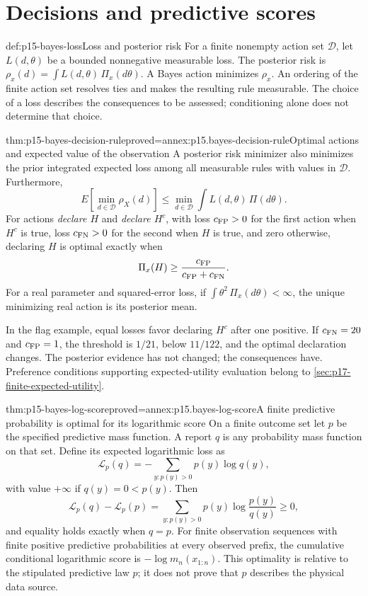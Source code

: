 \section{Decisions and predictive scores}
\label{sec:p15-bayes-decisions}

\begin{hbdefinition}{def:p15-bayes-loss}{Loss and posterior risk}
For a finite nonempty action set \(\mathcal D\), let
\(L(d,\theta)\) be a bounded nonnegative measurable loss.
The posterior risk is
\(\rho_x(d)=\int L(d,\theta)\,\Pi_x(d\theta)\).
A Bayes action minimizes \(\rho_x\). An ordering of the finite
action set resolves ties and makes the resulting rule measurable.
The choice of a loss describes the consequences to be assessed;
conditioning alone does not determine that choice.
\end{hbdefinition}

\begin{hbtheorem}{thm:p15-bayes-decision-rule}{proved=annex:p15.bayes-decision-rule}{Optimal actions and expected value of the observation}
A posterior risk minimizer also minimizes the prior integrated
expected loss among all measurable rules with values in \(\mathcal D\).
Furthermore,
\[
 E\!\left[\min_{d\in\mathcal D}\rho_X(d)\right]
       \leq \min_{d\in\mathcal D}\int L(d,\theta)\,\Pi(d\theta).
\]
For actions \emph{declare \(H\)} and \emph{declare \(H^c\)}, with
loss \(c_{\rm FP}>0\) for the first action when \(H^c\) is true,
loss \(c_{\rm FN}>0\) for the second when \(H\) is true, and zero
otherwise, declaring \(H\) is optimal exactly when
\[
            \Pi_x(H)\geq\frac{c_{\rm FP}}{c_{\rm FP}+c_{\rm FN}}.
\]
For a real parameter and squared-error loss, if
\(\int\theta^2\,\Pi_x(d\theta)<\infty\), the unique minimizing
real action is its posterior mean.
\end{hbtheorem}

In the flag example, equal losses favor declaring \(H^c\) after one
positive. If \(c_{\rm FN}=20\) and \(c_{\rm FP}=1\), the threshold
is \(1/21\), below \(11/122\), and the optimal declaration changes.
The posterior evidence has not changed; the consequences have.
Preference conditions supporting expected-utility evaluation belong
to \cref{sec:p17-finite-expected-utility}.

\begin{hbtheorem}{thm:p15-bayes-log-score}{proved=annex:p15.bayes-log-score}{A finite predictive probability is optimal for its logarithmic score}
On a finite outcome set let \(p\) be the specified predictive mass
function. A report \(q\) is any probability mass function on that set.
Define its expected logarithmic loss as
\[
              \mathcal L_p(q)=-\sum_{y:p(y)>0}p(y)\log q(y),
\]
with value \(+\infty\) if \(q(y)=0<p(y)\).
Then
\[
 \mathcal L_p(q)-\mathcal L_p(p)
       =\sum_{y:p(y)>0}p(y)\log\frac{p(y)}{q(y)}\geq0,
\]
and equality holds exactly when \(q=p\).
For finite observation sequences with finite positive predictive
probabilities at every observed prefix, the cumulative conditional
logarithmic score is \(-\log m_n(x_{1:n})\).
This optimality is relative to the stipulated predictive law \(p\);
it does not prove that \(p\) describes the physical data source.
\end{hbtheorem}

